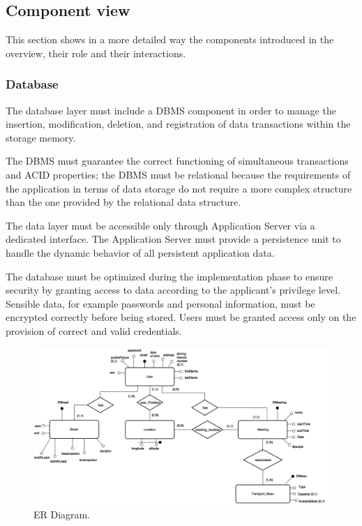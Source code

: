 \documentclass{article}
\begin{document}
	\newpage

	\subsection{Component view}

	This section shows in a more detailed way the components introduced in the overview, their role and their interactions.

	\subsubsection{Database}
	The database layer must include a DBMS component in order to manage the insertion, modification, deletion, and registration of data transactions within the storage memory.
	
	The DBMS must guarantee the correct functioning of simultaneous transactions and ACID properties; the DBMS must be relational because the requirements of the application in terms of data storage do not require a more complex structure than the one provided by the relational data structure.
	
	The data layer must be accessible only through Application Server via a dedicated interface. The Application Server must provide a persistence unit to handle the dynamic behavior of all persistent application data.
	
	The database must be optimized during the implementation phase to ensure security by granting access to data according to the applicant's privilege level. Sensible data, for example passwords and personal information, must be encrypted correctly before being stored. Users must be granted access only on the provision of correct and valid credentials.

	\begin{figure}[ht]
	\centering
	\includegraphics[width=\textwidth]{img/diagrams/er.png}
	\caption{ER Diagram.}
	\end{figure}
\end{document}
